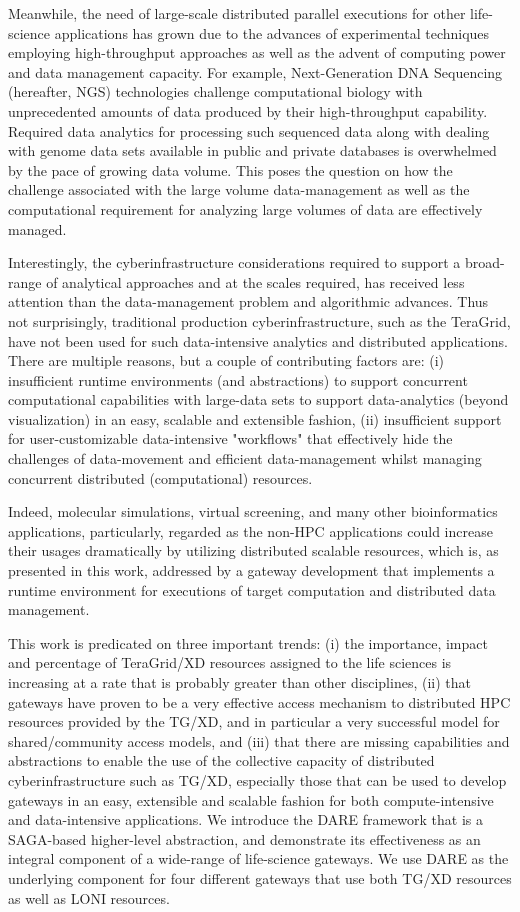 \documentclass{sig-alternate}
\begin{document}
Meanwhile, the need of large-scale distributed parallel executions for
other life-science applications has grown due to the advances of
experimental techniques employing high-throughput approaches as well as
the advent of computing power and data management capacity.  For
example, Next-Generation DNA Sequencing (hereafter, NGS) technologies
challenge computational biology with unprecedented amounts of data
produced by their high-throughput capability.  Required data analytics
for processing such sequenced data along with dealing with genome data
sets available in public and private databases is overwhelmed by the
pace of growing data volume.  This poses the question on how the
challenge associated with the large volume data-management as well as the computational requirement
for analyzing large volumes of data are effectively managed.

Interestingly, the cyberinfrastructure considerations required to
support a broad-range of analytical approaches and at the scales
required, has received less attention than the data-management problem
and algorithmic advances.  Thus not surprisingly, traditional
production cyberinfrastructure, such as the TeraGrid, have not been
used for such data-intensive analytics and distributed applications. There are multiple reasons,
but a couple of contributing factors are: (i) insufficient runtime
environments (and abstractions) to support concurrent computational
capabilities with large-data sets to support data-analytics (beyond
visualization) in an easy, scalable and extensible fashion, (ii)
insufficient support for user-customizable data-intensive "workflows"
that effectively hide the challenges of data-movement and efficient
data-management whilst managing concurrent distributed (computational)
resources.

Indeed, molecular simulations, virtual screening, and many other bioinformatics applications, particularly, regarded as the non-HPC applications could increase their usages dramatically by utilizing distributed scalable resources, which is, as presented in this work, addressed by a gateway development that implements a runtime environment for executions of target computation and distributed data management.

This work is predicated on three important trends: (i) the importance,
impact and percentage of TeraGrid/XD resources assigned to the
life sciences is increasing at a rate that is probably greater than
other disciplines, (ii) that gateways have proven to be a very
effective access mechanism to distributed HPC resources provided by
the TG/XD, and in particular a very successful model for
shared/community access models, and (iii) that there are missing
capabilities and abstractions to enable the use of the collective
capacity of distributed cyberinfrastructure such as TG/XD, especially
those that can be used to develop gateways in an easy, extensible and
scalable fashion for both compute-intensive and data-intensive
applications. We introduce the DARE framework that is a SAGA-based
higher-level abstraction, and demonstrate its effectiveness as an
integral component of a wide-range of life-science gateways. We
use DARE as the underlying component for four different
gateways that use both TG/XD resources as well as LONI resources.
\end{document}
